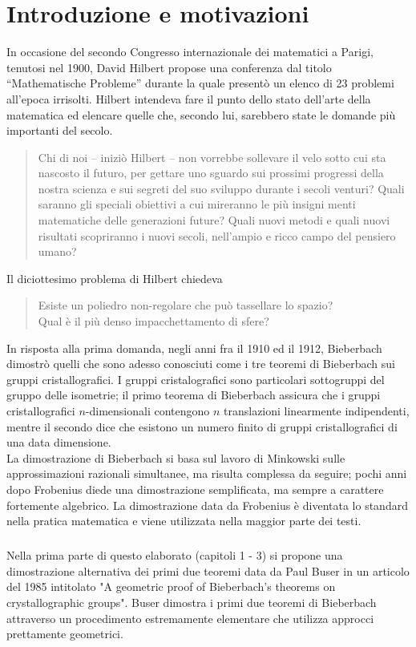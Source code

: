 \documentclass[a4paper,11pt,openright,twoside	]{book}
\author{Elisa Caruso}
\begin{document}
 
\chapter*{Introduzione e motivazioni}
In occasione del secondo Congresso internazionale dei matematici a Parigi, tenutosi nel 1900,  David Hilbert propose una conferenza dal titolo “Mathematische Probleme” durante la quale presentò un elenco di 23 problemi all'epoca irrisolti. Hilbert intendeva fare il punto dello stato dell'arte della matematica ed elencare quelle che, secondo lui, sarebbero state le domande più importanti del secolo. \begin{quote}
Chi di noi – iniziò Hilbert – non vorrebbe sollevare il velo sotto cui sta nascosto il futuro, per gettare uno sguardo sui prossimi progressi della nostra scienza e sui segreti del suo sviluppo durante i secoli venturi? Quali saranno gli speciali obiettivi a cui mireranno le più insigni menti matematiche delle generazioni future? Quali nuovi metodi e quali nuovi risultati scopriranno i nuovi secoli, nell’ampio e ricco campo del pensiero umano?
\end{quote}
Il diciottesimo problema di Hilbert chiedeva
\begin{quote}
Esiste un poliedro non-regolare che può tassellare lo spazio? \\
Qual è il più denso impacchettamento di sfere?	
\end{quote}
In risposta alla prima domanda, negli anni fra il 1910 ed il 1912, Bieberbach dimostrò quelli che sono adesso conosciuti come i tre teoremi di Bieberbach sui gruppi cristallografici. I gruppi cristalografici sono particolari sottogruppi del gruppo delle isometrie; il primo teorema di Bieberbach assicura che i gruppi cristallografici $n$-dimensionali contengono $n$ translazioni linearmente indipendenti, mentre il secondo dice che esistono un numero finito di gruppi cristallografici di una data dimensione. \\
La dimostrazione di Bieberbach si basa sul lavoro di Minkowski sulle approssimazioni razionali simultanee, ma risulta complessa da seguire; pochi anni dopo Frobenius diede una dimostrazione semplificata, ma sempre a carattere fortemente algebrico. La dimostrazione data da Frobenius è diventata lo standard nella pratica matematica e viene utilizzata nella maggior parte dei testi.
\paragraph{}
Nella prima parte di questo elaborato (capitoli 1 - 3) si propone una dimostrazione alternativa dei primi due teoremi data da Paul Buser in un articolo del 1985 intitolato "A geometric proof of Bieberbach's theorems on crystallographic groups". Buser dimostra i primi due teoremi di Bieberbach attraverso un procedimento estremamente elementare che utilizza approcci prettamente geometrici.
\end{document}
